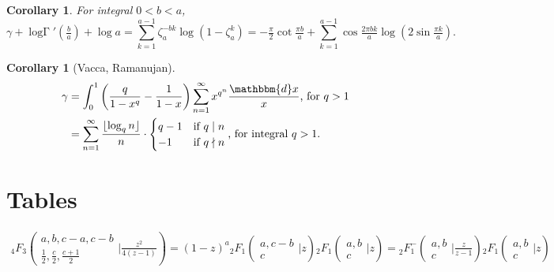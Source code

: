 \documentclass[12pt]{article}
\newcommand{\logG} {\operatorname {log \Gamma}}
\newcommand{\dd}[0] {\mathbbm{d}}
\numberwithin{equation}{section}
\newtheorem{corollary}[theorem]{Corollary}
\newcommand{\FFs}[6] {{}_{#1}{#2}_{#3} ( \begin{smallmatrix} #4 \\ #5 \end{smallmatrix} | {#6}  )}
\newcommand{\FFes}[7] {{}_{#1}^{\,}{#2}_{#3}^{#4} ( \begin{smallmatrix} #5 \\ #6 \end{smallmatrix} | {#7} )}
\begin{document}
\begin{corollary}
For integral $0<b<a$,
\begin{equation*}
\gamma + \logG'(\tfrac{b}{a}) + \log a = \sum_{k=1}^{a-1} \zeta_a^{-b k} \log (1 - \zeta_a^k)= - \tfrac{\pi}{2} \cot \tfrac{\pi b}{a} + \sum_{k=1}^{a-1} \cos \tfrac{2 \pi b k}{a} \log (2 \sin \tfrac{\pi k}{a} )\text{.}
\end{equation*}
\end{corollary}

\begin{corollary}[Vacca, Ramanujan]
\begin{align*}
\gamma &= \int_{0}^{1} \left(\frac{q}{1-x^q} - \frac{1}{1-x}\right) \sum_{n=1}^{\infty}x^{q^n} \frac{\dd x}{x}\text{, for } q > 1\\
&= \sum_{n=1}^{\infty} \frac{\lfloor \log_q n\rfloor}{n} \cdot \begin{cases}
q-1 & \text{if }q \mid n\\
-1 & \text{if }q \nmid n
\end{cases}
\text{, for integral } q>1 \text{.}
\end{align*}
\end{corollary}

\section{Tables}
\begin{gather*}
\FFs{4}{F}{3}{a,b,c-a,c-b}{\frac12, \frac{c}{2}, \frac{c+1}{2}}{\tfrac{z^2}{4(z-1)}} = (1-z)^a \FFs{2}{F}{1}{a,c-b}{c}{z} \FFs{2}{F}{1}{a,b}{c}{z} =  \FFes{2}{F}{1}{-}{a,b}{c}{\tfrac{z}{z-1}} \FFs{2}{F}{1}{a,b}{c}{z}
\end{gather*}
\end{document}
